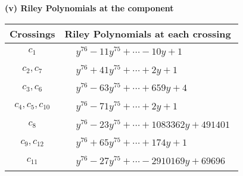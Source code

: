 \documentclass[1p]{elsarticle_modified}
\theoremstyle{definition}
\begin{document}
\newpage\renewcommand{\arraystretch}{1}
\flushleft \textbf{(v) Riley Polynomials at the component}\newline \\
\begin{tabular}{m{50pt}|m{274pt}}
Crossings & \hspace{64pt}Riley Polynomials at each crossing \\
\hline $$\begin{aligned}c_{1}\end{aligned}$$&$\begin{aligned}
&y^{76}-11 y^{75}+\cdots-10 y+1
\end{aligned}$\\
\hline $$\begin{aligned}c_{2},c_{7}\end{aligned}$$&$\begin{aligned}
&y^{76}+41 y^{75}+\cdots+2 y+1
\end{aligned}$\\
\hline $$\begin{aligned}c_{3},c_{6}\end{aligned}$$&$\begin{aligned}
&y^{76}-63 y^{75}+\cdots+659 y+4
\end{aligned}$\\
\hline $$\begin{aligned}c_{4},c_{5},c_{10}\end{aligned}$$&$\begin{aligned}
&y^{76}-71 y^{75}+\cdots+2 y+1
\end{aligned}$\\
\hline $$\begin{aligned}c_{8}\end{aligned}$$&$\begin{aligned}
&y^{76}-23 y^{75}+\cdots+1083362 y+491401
\end{aligned}$\\
\hline $$\begin{aligned}c_{9},c_{12}\end{aligned}$$&$\begin{aligned}
&y^{76}+65 y^{75}+\cdots+174 y+1
\end{aligned}$\\
\hline $$\begin{aligned}c_{11}\end{aligned}$$&$\begin{aligned}
&y^{76}-27 y^{75}+\cdots-2910169 y+69696
\end{aligned}$\\
\hline
\end{tabular}\\~\\
\end{document}
